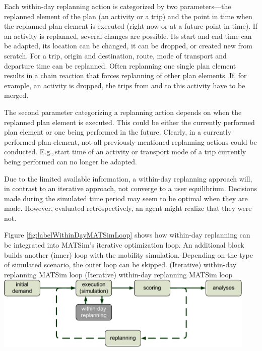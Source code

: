 Each within-day replanning action is categorized by two parameters---the replanned element of the plan (an activity or a trip) and the point in time when the replanned plan element is executed (right now or at a future point in time). If an activity is replanned, several changes are possible. Its start and end time can be adapted, its location can be changed, it can be dropped, or created new from scratch. For a trip, origin and destination, route, mode of transport and departure time can be replanned. Often replanning one single plan element results in a chain reaction that forces replanning of other plan elements. If, for example, an activity is dropped, the trips from and to this activity have to be merged.

The second parameter categorizing a replanning action depends on when the replanned plan element is executed. This could be either the currently performed plan element or one being performed in the future. Clearly, in a currently performed plan element, not all previously mentioned replanning actions could be conducted. E.g.,\,start time of an activity or transport mode of a trip currently being performed can no longer be adapted.

Due to the limited available information, a within-day replanning approach will, in contrast to an iterative approach, not converge to a user equilibrium. Decisions made during the simulated time period may seem to be optimal when they are made. However, evaluated retrospectively, an agent might realize that they were not.

Figure \ref{fig:labelWithinDayMATSimLoop} shows how within-day replanning can be integrated into MATSim's iterative optimization loop. An additional block builds another (inner) loop with the mobility simulation. Depending on the type of simulated scenario, the outer loop can be skipped.
\createfigure%
{(Iterative) within-day replanning MATSim loop}%
{(Iterative) within-day replanning MATSim loop }%
{\label{fig:labelWithinDayMATSimLoop}}%
{\includegraphics[width=12.5cm, angle=0]{extending/figures/WithinDayReplanning/WithinDayMATSimLoop}}%
{}%

